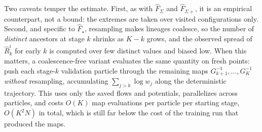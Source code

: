 \documentclass{article}
\begin{document}
{Two caveats temper the estimate. First, as with $\hat F_{\Sigma}$ and $\hat F_{\Sigma+}$, it is an empirical counterpart, not a bound: the extremes are taken over visited configurations only. Second, and specific to $\hat F_\star$, resampling makes lineages coalesce, so the number of \emph{distinct} ancestors at stage $k$ shrinks as $K-k$ grows, and the observed spread of $\hat R_k^i$ for early $k$ is computed over few distinct values and biased low. When this matters, a coalescence-free variant evaluates the same quantity on fresh points: push each stage-$k$ validation particle through the remaining maps $G_{k+1}^{-1},\dots,G_K^{-1}$ \emph{without} resampling, accumulating $\sum_{j>k}\log w_j$ along the deterministic trajectory. This uses only the saved flows and potentials, parallelizes across particles, and costs $O(K)$ map evaluations per particle per starting stage, $O(K^2N)$ in total, which is still far below the cost of the training run that produced the maps.
}

{
	
	
}
\end{document}
